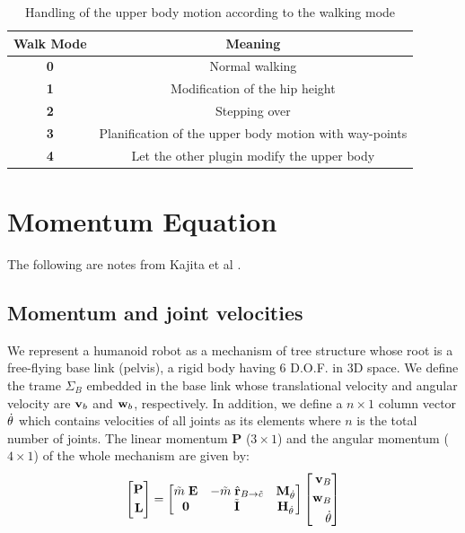 \begin{table}
\begin{tabular}{|c|c|} \hline
Walk Mode & Meaning \\ \hline \hline
{\bf 0} & Normal walking \\
{\bf 1} & Modification of the hip height \\
{\bf 2} & Stepping over \\
{\bf 3} & Planification of the upper body motion with way-points \\
{\bf 4} & Let the other plugin modify the upper body \\ \hline 
\end{tabular}
\caption{Handling of the upper body motion according to the walking mode}
\end{table}

\section{Momentum Equation}

The following are notes from Kajita et al \cite{Kajita2003b}.
\subsection{Momentum and joint velocities}
We represent a humanoid robot as a mechanism of tree structure whose root
is a free-flying base link (pelvis), a rigid body having 6 D.O.F. in 
3D space. We define the trame $\Sigma_B$ embedded in the base link whose translational
velocity and angular velocity are $\textit{\bf v}_b$ and $\textit{\bf w}_b$,
respectively. In addition, we define a $n \times 1$ column vector $\dot{\bf \theta}$
which contains velocities of all joints as its elements where $n$ is the total 
number of joints. The linear momentum $\textbf{P}$ ($3 \times 1$) and the
angular momentum ($4 \times 1$) of the whole mechanism are given by:
\begin{equation}
\left[
\begin{aligned}
\textbf{P}\\
\textbf{L}\\
\end{aligned}
\right] = 
\left[
\begin{matrix}
\tilde{m}\; {\bf E} & -\tilde{m}\;\hat{\bf r}_{B \rightarrow \tilde{c}} & {\bf M} _{\dot{\theta}} \\
{\bf 0}            & \tilde{\bf I}                                &{\bf H}_{\dot{\theta}} \\
\end{matrix}
\right]
\left[
\begin{aligned}
\textit{\bf v}_B \\
\textit{\bf w}_B \\
\dot{\bf \theta} \\
\end{aligned}
\right]
\label{eq:GlobalMomentum}
\end{equation}


